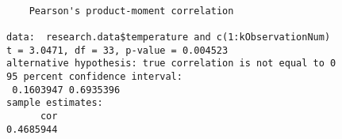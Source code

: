 \begin{verbatim} 

	Pearson's product-moment correlation

data:  research.data$temperature and c(1:kObservationNum)
t = 3.0471, df = 33, p-value = 0.004523
alternative hypothesis: true correlation is not equal to 0
95 percent confidence interval:
 0.1603947 0.6935396
sample estimates:
      cor 
0.4685944 

\end{verbatim}